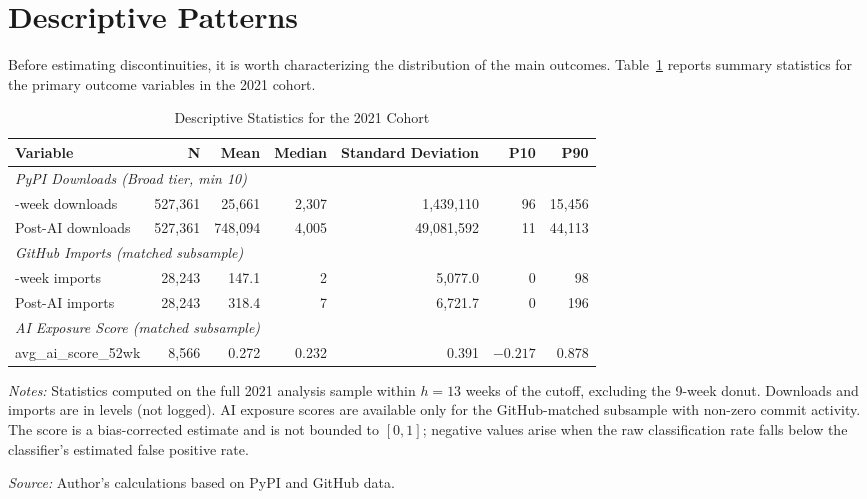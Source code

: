 \documentclass[12pt, a4paper]{report}
\begin{document}
\section{Descriptive Patterns}\label{sec:results-descriptive}
Before estimating discontinuities, it is worth characterizing the distribution of the main outcomes. Table~\ref{tab:descriptive} reports summary statistics for the primary outcome variables in the 2021 cohort.

\begin{table}[ht]
\centering
\caption{Descriptive Statistics for the 2021 Cohort}\label{tab:descriptive}
\small
\begin{tabular}{lrrrrrr}
\toprule
\textbf{Variable} & \textbf{N} & \textbf{Mean} & \textbf{Median} & \textbf{Standard Deviation} & \textbf{P10} & \textbf{P90} \\ \midrule
\multicolumn{7}{l}{\textit{PyPI Downloads (Broad tier, min 10)}} \\
\quad 52-week downloads & 527{,}361 & 25{,}661 & 2{,}307 & 1{,}439{,}110 & 96 & 15{,}456 \\
\quad Post-AI downloads  & 527{,}361 & 748{,}094 & 4{,}005 & 49{,}081{,}592 & 11 & 44{,}113 \\[4pt]
\multicolumn{7}{l}{\textit{GitHub Imports (matched subsample)}} \\
\quad 52-week imports     & 28{,}243 & 147.1 & 2 & 5{,}077.0 & 0 & 98 \\
\quad Post-AI imports     & 28{,}243 & 318.4 & 7 & 6{,}721.7 & 0 & 196 \\[4pt]
\multicolumn{7}{l}{\textit{AI Exposure Score (matched subsample)}} \\
\quad avg\_ai\_score\_52wk & 8{,}566 & 0.272 & 0.232 & 0.391 & $-0.217$ & 0.878 \\
\bottomrule
\end{tabular}
\begin{tablenotes}
\small
\item \textit{Notes:} Statistics computed on the full 2021 analysis sample within $h = 13$ weeks of the cutoff, excluding the 9-week donut. Downloads and imports are in levels (not logged). AI exposure scores are available only for the GitHub-matched subsample with non-zero commit activity. The score is a bias-corrected estimate and is not bounded to $[0,1]$; negative values arise when the raw classification rate falls below the classifier's estimated false positive rate.
\item \textit{Source:} Author's calculations based on PyPI and GitHub data.
\end{tablenotes}
\end{table}
\end{document}

